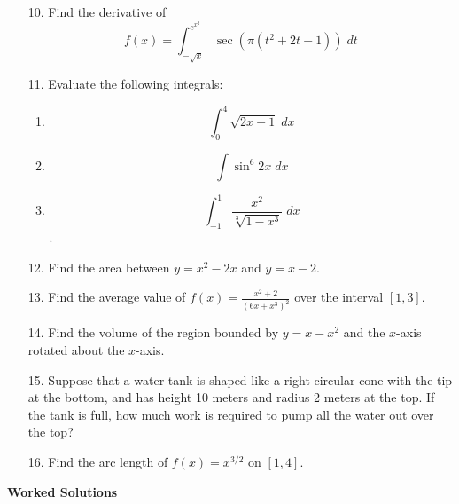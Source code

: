 \documentclass[11pt,reqno]{article}
\theoremstyle{definition}
\begin{document}
\begin{itemize}
		\item[10.] Find the derivative of $$f(x) = \int_{-\sqrt{x}}^{e^{x^2 }} \sec(\pi(t^2 + 2t - 1)) \; dt$$
		\item[11.] Evaluate the following integrals: 
		\begin{enumerate}
			\item $$\int_{0}^{4} \sqrt{2x + 1} \; dx$$
			\item $$\int \sin^6 2x \; dx$$ 
			\item $$\int_{-1}^{1} \frac{x^2}{\sqrt[3]{1 - x^3}} \; dx$$. 
		\end{enumerate}
		\item[12.] Find the area between $y = x^2 - 2x$ and $y = x - 2$. 
		\item[13.] Find the average value of $f(x) = \frac{x^2 + 2}{(6x + x^3)^2}$ over the interval $[1, 3]$. 
		\item[14.] Find the volume of the region bounded by $y = x - x^2$ and the $x$-axis rotated about the $x$-axis.
		\item[15.] Suppose that a water tank is shaped like a right circular cone with the tip at the bottom, and has height 10 meters and radius 2 meters at the top. If the tank is full, how much work is required to pump all the water out over the top? 
		\item[16.] Find the arc length of $f(x) = x^{3/2}$ on $[1,4]$. 
		
	\end{itemize}

	\newpage
	
	\textbf{\Large{Worked Solutions}}
	
\end{document}
